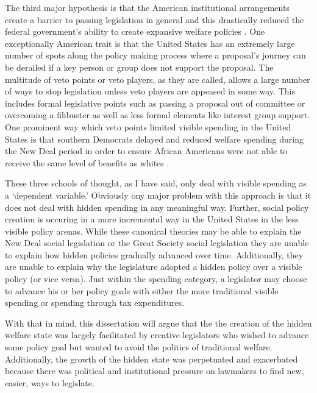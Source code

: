 \documentclass[12pt]{article}
\begin{document}
The third major hypothesis is that the American institutional arrangements create a barrier to passing legislation in general and this drastically reduced the federal government's ability to create expansive welfare policies \citep{pierson1995, robertson2011}. One exceptionally American trait is that the United States has an extremely large number of spots along the policy making process where a proposal's journey can be derailed if a key person or group does not support the proposal. The multitude of veto points or veto players, as they are called, allows a large number of ways to stop legislation unless veto players are appeased in some way. This includes formal legislative points such as passing a proposal out of committee or overcoming a filibuster as well as less formal elements like interest group support. One prominent way which veto points limited visible spending in the United States is that southern Democrats delayed and reduced welfare spending during the New Deal period in order to ensure African Americans were not able to receive the same level of benefits as whites \citep{katznelson2013}. 

These three schools of thought, as I have said, only deal with visible spending as a `dependent variable.' Obviously ony major problem with this approach is that it does not deal with hidden spending in any meaningful way. Further, social policy creation is occuring in a more incremental way in the United States in the less visible policy arenas. While these canonical theories may be able to explain the New Deal social legislation or the Great Society social legislation they are unable to explain how hidden policies gradually advanced over time. Additionally, they are unable to explain why the legislature adopted a hidden policy over a visible policy (or vice versa). Just within the spending category, a legislator may choose to advance his or her policy goals with either the more traditional visible spending or spending through tax expenditures.

With that in mind, this dissertation will argue that the the creation of the hidden welfare state was largely facilitated by creative legislators who wished to advance some policy goal but wanted to avoid the politics of traditional welfare. Additionally, the growth of the hidden state was perpetuated and exacerbated because there was political and institutional pressure on lawmakers to find new, easier, ways to legislate. 

  
\end{document}
